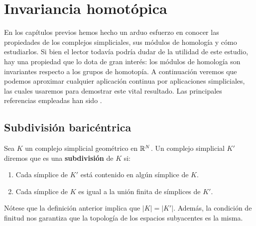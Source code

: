 
\chapter{Invariancia homotópica}

En los capítulos previos hemos hecho un arduo esfuerzo en conocer las propiedades de los complejos simpliciales, sus módulos de homología y cómo estudiarlos. Si bien el lector todavía podría dudar de la utilidad de este estudio, hay una propiedad que lo dota de gran interés: los módulos de homología son invariantes respecto a los grupos de homotopía. A continuación veremos que podemos aproximar cualquier aplicación continua por aplicaciones simpliciales, las cuales usaremos para demostrar este vital resultado. Las principales referencias empleadas han sido \cite{rafael2003elementos} \cite{Armstrong1983}.

\section{Subdivisión baricéntrica}

\begin{definicion}
	Sea $K$ un complejo simplicial geométrico en $\mathbb{R}^N$. Un complejo simplicial $K'$ diremos que es una \textbf{subdivisión} de $K$ si:
	\begin{enumerate}
		\item Cada símplice de $K'$ está contenido en algún símplice de $K$.
		\item Cada símplice de $K$ es igual a la unión finita de símplices de $K'$.
	\end{enumerate}
\end{definicion}
\begin{observacion}
	Nótese que la definición anterior implica que $|K|=|K'|$. Además, la condición de finitud nos garantiza que la topología de los espacios subyacentes es la misma.
\end{observacion}

